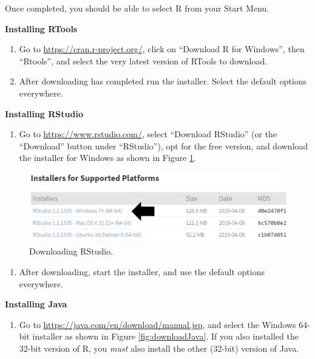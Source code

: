 \documentclass[11pt]{book}
\providecommand{\tightlist}{%
  \setlength{\itemsep}{0pt}\setlength{\parskip}{0pt}}
\theoremstyle{definition}
\theoremstyle{definition}
\theoremstyle{definition}
\theoremstyle{remark}
\begin{document}
Once completed, you should be able to select R from your Start Menu.

\textbf{Installing RTools}

\begin{enumerate}
\def\labelenumi{\arabic{enumi}.}
\item
  Go to \url{https://cran.r-project.org/}, click on ``Download R for Windows'', then ``Rtools'', and select the very latest version of RTools to download.
\item
  After downloading has completed run the installer. Select the default options everywhere.
\end{enumerate}

\textbf{Installing RStudio}

\begin{enumerate}
\def\labelenumi{\arabic{enumi}.}
\tightlist
\item
  Go to \url{https://www.rstudio.com/}, select ``Download RStudio'' (or the ``Download'' button under ``RStudio''), opt for the free version, and download the installer for Windows as shown in Figure \ref{fig:downloadRStudio}.
\end{enumerate}

\begin{figure}

{\centering \includegraphics[width=1\linewidth]{images/OhdsiAnalyticsTools/downloadRStudio} 

}

\caption{Downloading RStudio.}\label{fig:downloadRStudio}
\end{figure}

\begin{enumerate}
\def\labelenumi{\arabic{enumi}.}
\setcounter{enumi}{1}
\tightlist
\item
  After downloading, start the installer, and use the default options everywhere.
\end{enumerate}

\textbf{Installing Java}

\begin{enumerate}
\def\labelenumi{\arabic{enumi}.}
\tightlist
\item
  Go to \url{https://java.com/en/download/manual.jsp}, and select the Windows 64-bit installer as shown in Figure \ref{fig:downloadJava}. If you also installed the 32-bit version of R, you \emph{must} also install the other (32-bit) version of Java.
\end{enumerate}
\end{document}
